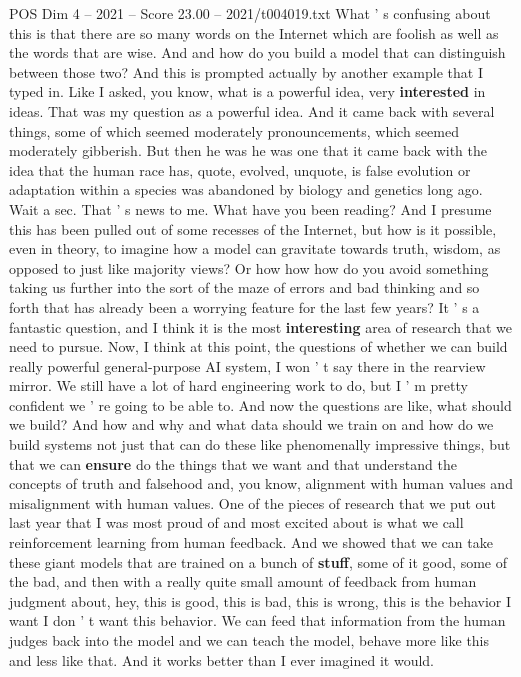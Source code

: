 \begin{textsample}{POS Dim 4 – 2021 – Score 23.00 – 2021/t004019.txt}
What ' s confusing about this is that there are so many words on the Internet which are foolish as well as the words that are wise.
And and how do you build a model that can distinguish between those two?
And this is prompted actually by another example that I typed in.
Like I asked, you know, what is a powerful idea, very \textbf{interested} in ideas.
That was my question as a powerful idea.
And it came back with several things, some of which seemed moderately pronouncements, which seemed moderately gibberish.
But then he was he was one that it came back with the idea that the human race has, quote, evolved, unquote, is false evolution or adaptation within a species was abandoned by biology and genetics long ago.
Wait a sec.
That ' s news to me.
What have you been reading?
And I presume this has been pulled out of some recesses of the Internet, but how is it possible, even in theory, to imagine how a model can gravitate towards truth, wisdom, as opposed to just like majority views?
Or how how how do you avoid something taking us further into the sort of the maze of errors and bad thinking and so forth that has already been a worrying feature for the last few years?
It ' s a fantastic question, and I think it is the most \textbf{interesting} area of research that we need to pursue.
Now, I think at this point, the questions of whether we can build really powerful general-purpose AI system, I won ' t say there in the rearview mirror.
We still have a lot of hard engineering work to do, but I ' m pretty confident we ' re going to be able to.
And now the questions are like, what should we build?
And how and why and what data should we train on and how do we build systems not just that can do these like phenomenally impressive things, but that we can \textbf{ensure} do the things that we want and that understand the concepts of truth and falsehood and, you know, alignment with human values and misalignment with human values.
One of the pieces of research that we put out last year that I was most proud of and most excited about is what we call reinforcement learning from human feedback.
And we showed that we can take these giant models that are trained on a bunch of \textbf{stuff}, some of it good, some of the bad, and then with a really quite small amount of feedback from human judgment about, hey, this is good, this is bad, this is wrong, this is the behavior I want I don ' t want this behavior.
We can feed that information from the human judges back into the model and we can teach the model, behave more like this and less like that.
And it works better than I ever imagined it would.

\end{textsample}
